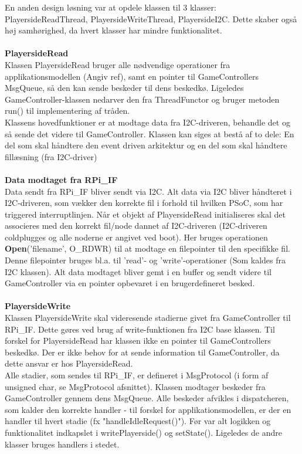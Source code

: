 \documentclass[Softwaredesign/Softwaredesign_main.tex]{subfiles}
\begin{document}
En anden design løsning var at opdele klassen til 3 klasser: PlayersideReadThread, PlayersideWriteThread, PlayersideI2C. Dette skaber også høj samhørighed, da hvert klasser har mindre funktionalitet.  
\\\\\textbf{PlayersideRead}
\\Klassen PlayersideRead bruger alle nødvendige operationer fra applikationsmodellen (Angiv ref), samt en pointer til GameControllers MsgQueue, så den kan sende beskeder til dens beskedkø. Ligeledes GameController-klassen nedarver den fra ThreadFunctor og bruger metoden run() til implementering af tråden.
\\Klassens hovedfunktioner er at modtage data fra I2C-driveren, behandle det og så sende det videre til GameController. Klassen kan siges at bestå af to dele: En del som skal håndtere den event driven arkitektur og en del som skal håndtere fillæsning (fra I2C-driver)
\\\\\textbf{Data modtaget fra RPi\_IF}
\\Data sendt fra RPi\_IF bliver sendt via I2C. Alt data via I2C bliver håndteret i I2C-driveren, som vækker den korrekte fil i forhold til hvilken PSoC, som har triggered interruptlinjen. Når et objekt af PlayersideRead initialiseres skal det associeres med den korrekt fil/node dannet af I2C-driveren (I2C-driveren coldplugges og alle noderne er angivet ved boot). Her bruges operationen \textbf{Open}('filename', O\_RDWR) til at modtage en filepointer til den specifikke fil. Denne filepointer bruges bl.a. til 'read'- og 'write'-operationer (Som kaldes fra I2C klassen). Alt data modtaget bliver gemt i en buffer og sendt videre til GameController via en pointer opbevaret i en brugerdefineret besked. 
\\\\\textbf{PlayersideWrite}
\\Klassen PlayersideWrite skal videresende stadierne givet fra GameController til RPi\_IF. Dette gøres ved brug af write-funktionen fra I2C base klassen. Til forskel for PlayersideRead har klassen ikke en pointer til GameControllers beskedkø. Der er ikke behov for at sende information til GameController, da dette ansvar er hos PlayersideRead.
\\Alle stadier, som sendes til RPi\_IF, er defineret i MsgProtocol (i form af unsigned char, se MsgProtocol afsnittet). Klassen modtager beskeder fra GameController gennem dens MsgQueue. Alle beskeder afvikles i dispatcheren, som kalder den korrekte handler - til forskel for applikationsmodellen, er der en handler til hvert stadie (fx "handleIdleRequest()"). Før var alt logikken og funktionalitet indkapslet i writePlayerside() og setState(). Ligeledes de andre klasser bruges handlers i stedet.
\end{document}
